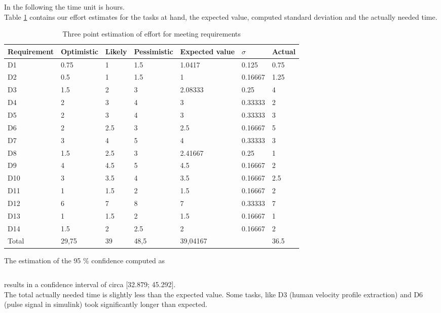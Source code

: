 In the following the time unit is hours.\\
Table \ref{tbl:D1_effort_estimation} contains our effort estimates for the tasks at hand, the expected value, computed standard deviation and the actually needed time.
\begin{table}[H]
\centering
\caption{Three point estimation of effort for meeting requirements}
\begin{adjustbox}{width=1\textwidth, center=\textwidth}
\renewcommand{\arraystretch}{1}
\begin{tabular}{lllllll}
\textbf{Requirement} & \textbf{Optimistic} & \textbf{Likely} & \textbf{Pessimistic} & \textbf{Expected value} & \textbf{$\sigma$} & \textbf{Actual}\\\hline
	D1 & 0.75 & 1 & 1.5 & 1.0417 & 0.125 & 0.75 \\
	D2 & 0.5 & 1 & 1.5 & 1 & 0.16667 & 1.25 \\
	D3 & 1.5 & 2 & 3 & 2.08333 & 0.25 & 4 \\
	D4 & 2 & 3 & 4 & 3 & 0.33333 & 2 \\
	D5 & 2 & 3 & 4 & 3 & 0.33333 & 3 \\
	D6 & 2 & 2.5 & 3 & 2.5 & 0.16667 & 5 \\
	D7 & 3 & 4 & 5 & 4 & 0.33333 & 3 \\
	D8 & 1.5 & 2.5 & 3 & 2.41667 & 0.25 & 1 \\
	D9 & 4 & 4.5 & 5 & 4.5 & 0.16667& 2 \\
	D10 & 3 & 3.5 & 4 & 3.5 & 0.16667 & 2.5 \\
	D11 & 1 & 1.5 & 2 & 1.5 & 0.16667 & 2 \\
	D12 & 6 & 7 & 8 & 7 & 0.33333 & 7 \\
	D13 & 1 & 1.5 & 2 & 1.5 & 0.16667 & 1 \\
	D14 & 1.5 & 2 & 2.5 & 2 & 0.16667 & 2 \\\hline
	Total & 29,75 & 39 & 48,5 & 39,04167 & \ & 36.5
\end{tabular}
\end{adjustbox}
\label{tbl:D1_effort_estimation}
\end{table}

The estimation of the 95 \% confidence computed as

\begin{equation}
	[E(project) - 2*\sigma;\; E(project) + 2*\sigma]
\end{equation}

results in a confidence interval of circa [32.879; 45.292].\\
The total actually needed time is slightly less than the expected value.
Some tasks, like D3 (human velocity profile extraction) and D6 (pulse signal in simulink) took significantly longer than expected.

